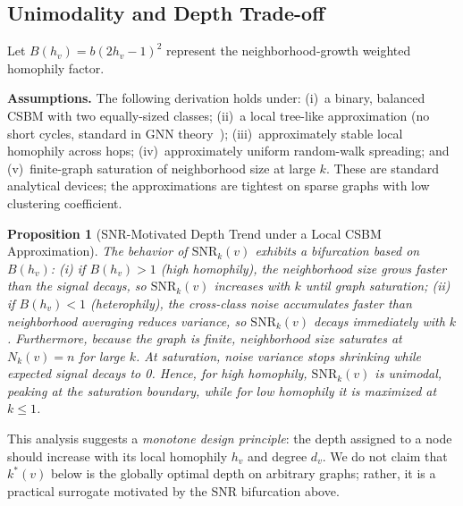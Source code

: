 \documentclass[letterpaper]{article}
\newtheorem{proposition}{Proposition}
\begin{document}
\subsection{Unimodality and Depth Trade-off}
Let $B(h_v) = b (2h_v - 1)^2$ represent the neighborhood-growth weighted homophily factor.

\noindent\textbf{Assumptions.}\;
The following derivation holds under: (i)~a binary, balanced CSBM with two equally-sized classes; (ii)~a local tree-like approximation (no short cycles, standard in GNN theory~\cite{baranwal2022gcn}); (iii)~approximately stable local homophily across hops; (iv)~approximately uniform random-walk spreading; and (v)~finite-graph saturation of neighborhood size at large $k$. These are standard analytical devices; the approximations are tightest on sparse graphs with low clustering coefficient.

\begin{proposition}[SNR-Motivated Depth Trend under a Local CSBM Approximation]
The behavior of $\mathrm{SNR}_k(v)$ exhibits a bifurcation based on $B(h_v)$:
(i) if $B(h_v) > 1$ (high homophily), the neighborhood size grows faster than the signal decays, so $\mathrm{SNR}_k(v)$ increases with $k$ until graph saturation;
(ii) if $B(h_v) < 1$ (heterophily), the cross-class noise accumulates faster than neighborhood averaging reduces variance, so $\mathrm{SNR}_k(v)$ decays immediately with $k$.
Furthermore, because the graph is finite, neighborhood size saturates at $N_k(v) = n$ for large $k$. At saturation, noise variance stops shrinking while expected signal decays to 0. Hence, for high homophily, $\mathrm{SNR}_k(v)$ is unimodal, peaking at the saturation boundary, while for low homophily it is maximized at $k \le 1$.
\end{proposition}

This analysis suggests a \emph{monotone design principle}: the depth assigned to a node should increase with its local homophily $h_v$ and degree $d_v$. We do not claim that $k^*(v)$ below is the globally optimal depth on arbitrary graphs; rather, it is a practical surrogate motivated by the SNR bifurcation above.
\end{document}
